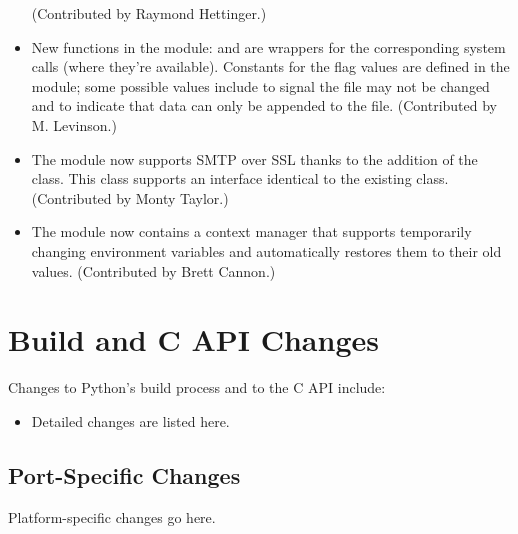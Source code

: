 \documentclass{howto}
\begin{document}
\begin{itemize}
(Contributed by Raymond Hettinger.)

\item New functions in the  module: 
and  are wrappers for the corresponding system
calls (where they're available).  Constants for the flag values are
defined in the  module; some possible values include
 to signal the file may not be changed and
 to indicate that data can only be appended to the
file.  (Contributed by M. Levinson.)

\item The  module now supports SMTP over 
SSL thanks to the addition of the  class.
This class supports an interface identical to the existing  
class. (Contributed by Monty Taylor.)

\item The  module now contains a
 context manager that 
supports temporarily changing environment variables and 
automatically restores them to their old values.
(Contributed by Brett Cannon.)

\end{itemize}




\section{Build and C API Changes}

Changes to Python's build process and to the C API include:

\begin{itemize}

\item Detailed changes are listed here.

\end{itemize}


\subsection{Port-Specific Changes}

Platform-specific changes go here.
\end{document}
